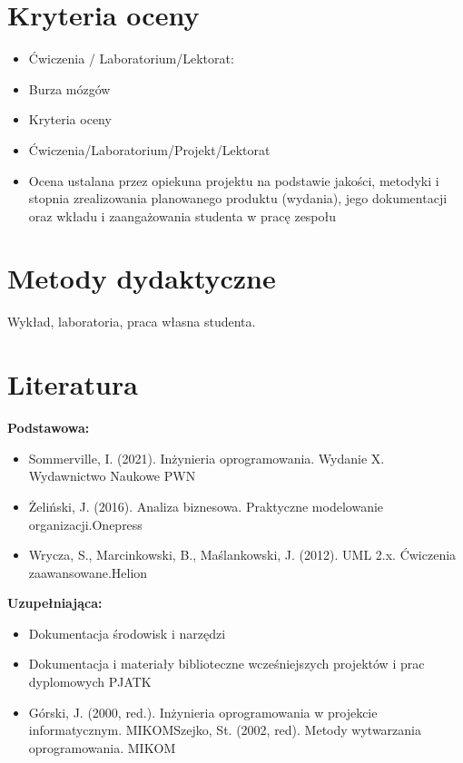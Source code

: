 \documentclass[12pt, a4paper]{article}
\begin{document}
\section{Kryteria oceny}

\begin{itemize}
  \item Ćwiczenia / Laboratorium/Lektorat:
  \item Burza mózgów
  \item Kryteria oceny
  \item Ćwiczenia/Laboratorium/Projekt/Lektorat
  \item Ocena ustalana przez opiekuna projektu na podstawie jakości, metodyki i stopnia zrealizowania planowanego produktu (wydania), jego dokumentacji oraz wkładu i zaangażowania studenta w pracę zespołu
\end{itemize}

\section{Metody dydaktyczne}

Wykład, laboratoria, praca własna studenta.

\section{Literatura}

\textbf{Podstawowa:}
\begin{itemize}
  \item Sommerville, I. (2021). Inżynieria oprogramowania. Wydanie X. Wydawnictwo Naukowe PWN
  \item Żeliński, J. (2016). Analiza biznesowa. Praktyczne modelowanie organizacji.Onepress
  \item Wrycza, S., Marcinkowski, B., Maślankowski, J. (2012). UML 2.x. Ćwiczenia zaawansowane.Helion
\end{itemize}

\textbf{Uzupełniająca:}
\begin{itemize}
  \item Dokumentacja środowisk i narzędzi
  \item Dokumentacja i materiały biblioteczne wcześniejszych projektów i prac dyplomowych PJATK
  \item Górski, J. (2000, red.). Inżynieria oprogramowania w projekcie informatycznym. MIKOMSzejko, St. (2002, red). Metody wytwarzania oprogramowania. MIKOM
\end{itemize}
\end{document}
